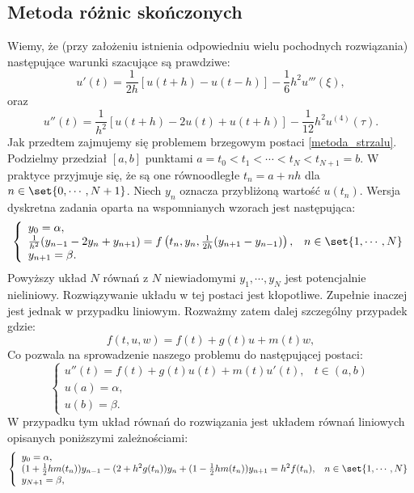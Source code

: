 \subsection{Metoda różnic skończonych} \label{subsection-boundary-theory-finite-differences}
Wiemy, że (przy założeniu istnienia odpowiedniu wielu pochodnych rozwiązania) następujące warunki szacujące są prawdziwe:
\begin{equation}\label{roznice_skoncz_I}
u'(t) = \frac{1}{2h}[u(t+h) - u(t-h)] - \frac{1}{6}h^2u'''(\xi),
\end{equation}
oraz 
\begin{equation}\label{roznice_skoncz_II}
u''(t) = \frac{1}{h^2}[u(t+h) - 2u(t) + u(t+h)] - \frac{1}{12}h^2u^{(4)}(\tau).
\end{equation}
Jak przedtem zajmujemy się problemem brzegowym postaci \eqref{metoda_strzalu}. Podzielmy przedział $[a,b]$ punktami $ a=t_0<t_1<\cdots<t_N<t_{N+1}=b $. W praktyce przyjmuje się, że są one równoodległe $t_n = a + nh$ dla $n \in \set{0,\cdots,N+1}$. Niech $y_n$ oznacza przybliżoną wartość $u(t_n)$. Wersja dyskretna zadania oparta na wspomnianych wzorach jest następująca:
$$
\left\{\begin{array}{ll}
y_0 = \alpha, & \\
\frac{1}{h^2}(y_{n-1}-2y_n + y_{n+1}) = f\left(t_n,y_n,\frac{1}{2h}(y_{n+1} - y_{n-1})\right),& n \in \set{1,\cdots,N} \\
y_{n+1} = \beta.
\end{array}\right. 
$$
Powyższy układ $N$ równań z $N$ niewiadomymi $y_1,\cdots,y_N$ jest potencjalnie nieliniowy. Rozwiązywanie układu w tej postaci jest kłopotliwe. Zupełnie inaczej jest jednak w przypadku liniowym. Rozważmy zatem dalej szczególny przypadek gdzie:
$$
f(t,u,w) =f(t) +  g(t) u + m(t) w,
$$
Co pozwala na sprowadzenie naszego problemu do następującej postaci:
\begin{equation}
\left\{\begin{array}{ll}
u''(t)=f(t) + g(t) u(t) + m(t) u'(t), & t \in (a,b) \\
u(a)= \alpha, & \\
u(b)= \beta.
\end{array}\right.
\end{equation}
W przypadku tym układ równań do rozwiązania jest układem równań liniowych opisanych poniższymi zależnościami:
\begin{equation}\label{zagadnienie_liniowe}
\left\{\begin{array}{ll}
y_0 = \alpha, & \\
(1+ \frac{1}{2}h m(t_n))y_{n-1} - (2+ h^2 g(t_n))y_n + (1- \frac{1}{2}h m(t_n))y_{n+1} = h^2 f(t_n) ,& n \in \set{1,\cdots,N} \\
y_{N+1} = \beta,
\end{array}\right. 
\end{equation}

